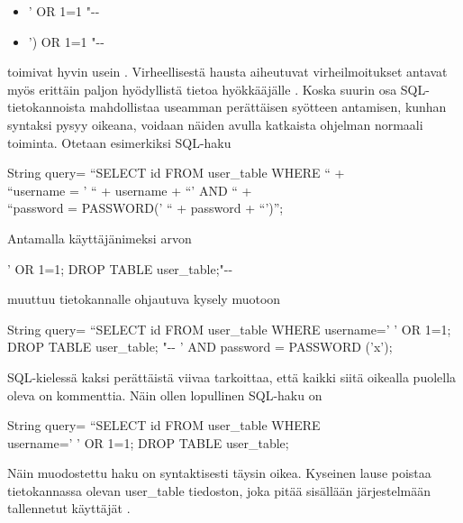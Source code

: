 \begin{itemize}
\item ' OR 1=1 "{-}{-}
\item ') OR 1=1 "{-}{-}
\end {itemize}
toimivat hyvin usein \cite{WEB2}. Virheellisestä hausta aiheutuvat virheilmoitukset antavat myös erittäin paljon
hyödyllistä tietoa hyökkääjälle \cite{SQLSS}. Koska suurin osa SQL-tietokannoista mahdollistaa useamman perättäisen syötteen 
antamisen, kunhan syntaksi pysyy oikeana, voidaan näiden avulla katkaista ohjelman normaali toiminta. Otetaan esimerkiksi SQL-haku
\begin{tt}
\begin{center}
String query= ``SELECT id FROM user\_table WHERE `` + \\
``username = ' `` + username + ``' AND `` + \\
``password = PASSWORD(' `` + password + ``')''; \\
\end{center}
\end{tt}
Antamalla käyttäjänimeksi arvon

\begin{tt}
\begin{center}
' OR 1=1; DROP TABLE user\_table;"{-}{-}
\end{center}
\end{tt}
muuttuu tietokannalle ohjautuva kysely muotoon

\begin{tt}
\begin{center}
String query= ``SELECT id FROM user\_table WHERE username=' ' OR 1=1; DROP TABLE
user\_table; "{-}{-} ' AND password = PASSWORD ('x');
\end{center}
\end{tt}
SQL-kielessä kaksi perättäistä viivaa tarkoittaa, että kaikki siitä oikealla puolella oleva on kommenttia. 
Näin ollen lopullinen SQL-haku on 

\begin{tt}
\begin{center}
String query= ``SELECT id FROM user\_table WHERE \\username=' ' OR 1=1; DROP TABLE
user\_table;
\end{center}
\end{tt}
Näin muodostettu haku on syntaktisesti täysin oikea. Kyseinen lause poistaa tietokannassa olevan user\_table tiedoston, joka pitää
sisällään järjestelmään tallennetut käyttäjät \cite{WEB2}. 

